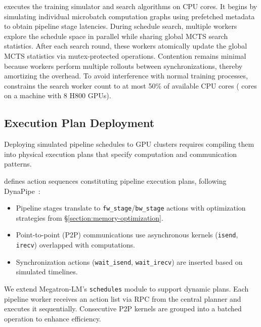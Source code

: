 \sys{} executes the training simulator and search algorithms on CPU cores.
It begins by simulating individual microbatch computation graphs using prefetched metadata to obtain pipeline stage latencies.
During schedule search, multiple workers explore the schedule space in parallel while sharing global MCTS search statistics.
After each search round, these workers atomically update the global MCTS statistics via mutex-protected operations.
Contention remains minimal because workers perform multiple rollouts between synchronizations, thereby amortizing the overhead.
To avoid interference with normal training processes, \sys{} constrains the search worker count to at most 50\% of available CPU cores
( cores on a machine with 8 H800 GPUs).

\subsection{Execution Plan Deployment}

Deploying simulated pipeline schedules to GPU clusters requires compiling them into physical execution plans
that specify computation and communication patterns.

\sys{} defines action sequences constituting pipeline execution plans, following DynaPipe~\cite{dynapipe-eurosys24}:
\begin{itemize}
    \item Pipeline stages translate to \texttt{fw\_stage}/\texttt{bw\_stage} actions with optimization strategies from \S\ref{section:memory-optimization}.
    \item Point-to-point (P2P) communications use asynchronous kernels (\texttt{isend}, \texttt{irecv}) overlapped with computations.
    \item Synchronization actions (\texttt{wait\_isend}, \texttt{wait\_irecv}) are inserted based on simulated timelines.
\end{itemize}

We extend Megatron-LM's \texttt{schedules} module to support dynamic plans.
Each pipeline worker receives an action list via RPC from the central planner
and executes it sequentially.
Consecutive P2P kernels are grouped into a batched operation to enhance efficiency.
